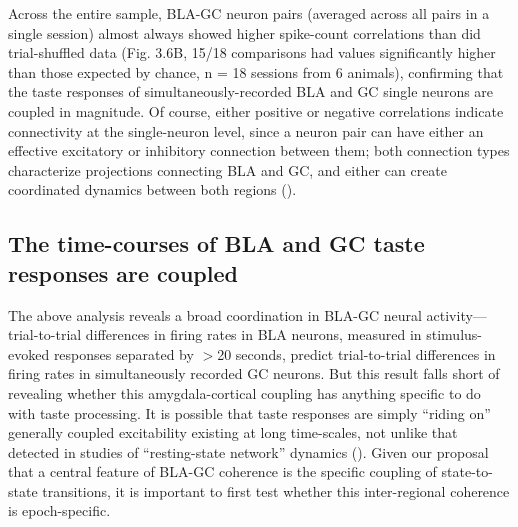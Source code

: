 \begin{refsection}
Across the entire sample, BLA-GC neuron pairs (averaged across all pairs in a single session) almost always showed higher spike-count correlations than did trial-shuffled data (Fig. 3.6B, 15/18 comparisons had values significantly higher than those expected by chance, n = 18 sessions from 6 animals), confirming that the taste responses of simultaneously-recorded BLA and GC single neurons are coupled in magnitude. Of course, either positive or negative correlations indicate connectivity at the single-neuron level, since a neuron pair can have either an effective excitatory or inhibitory connection between them; both connection types characterize projections connecting BLA and GC, and either can create coordinated dynamics between both regions (\cite{haley2016a,fu2020a}).

\subsection{The time-courses of BLA and GC taste responses are coupled}
The above analysis reveals a broad coordination in BLA-GC neural activity—trial-to-trial differences in firing rates in BLA neurons, measured in stimulus-evoked responses separated by \(>\)20 seconds, predict trial-to-trial differences in firing rates in simultaneously recorded GC neurons. But this result falls short of revealing whether this amygdala-cortical coupling has anything specific to do with taste processing. It is possible that taste responses are simply “riding on” generally coupled excitability existing at long time-scales, not unlike that detected in studies of “resting-state network” dynamics (\cite{raichle2015a,seitzman2019a}). Given our proposal that a central feature of BLA-GC coherence is the specific coupling of state-to-state transitions, it is important to first test whether this inter-regional coherence is epoch-specific.


\end{refsection}

